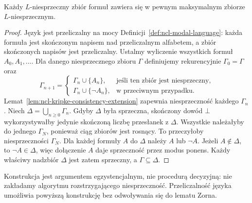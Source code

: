 \begin{lemat}
\label{lem:ncl-kripke-lindenbaum-extension}
Każdy $L$-niesprzeczny zbiór formuł zawiera
się w pewnym maksymalnym zbiorze
$L$-niesprzecznym.
\end{lemat}
\begin{proof}
Język jest przeliczalny na mocy
Definicji~\ref{def:ncl-modal-language}:
każda formuła jest skończonym napisem
nad przeliczalnym alfabetem, a zbiór
skończonych napisów jest przeliczalny.
Ustalmy wyliczenie wszystkich formuł
$A_0,A_1,\ldots$. Dla danego niesprzecznego
zbioru $\Gamma$ definiujemy rekurencyjnie
$\Gamma_0=\Gamma$ oraz
\[
 \Gamma_{n+1}=
 \begin{cases}
  \Gamma_n\cup\{A_n\},&
    \text{jeśli ten zbiór jest niesprzeczny},\\
  \Gamma_n\cup\{\neg A_n\},&
    \text{w przeciwnym przypadku}.
 \end{cases}
\]
Lemat~\ref{lem:ncl-kripke-consistency-extension}
zapewnia niesprzeczność każdego $\Gamma_n$.
Niech $\Delta=\bigcup_{n\geq 0}\Gamma_n$.
Gdyby $\Delta$ była sprzeczna, skończony
dowód $\bot$ wykorzystywałby jedynie skończoną
liczbę przesłanek z $\Delta$.
Wszystkie należałyby do jednego $\Gamma_N$,
ponieważ ciąg zbiorów jest rosnący.
To przeczyłoby niesprzeczności $\Gamma_N$.
Dla każdej formuły $A$ do $\Delta$ należy
$A$ lub $\neg A$. Jeżeli $A\notin\Delta$,
to $\neg A\in\Delta$, więc dołączenie $A$
daje sprzeczność przez modus ponens.
Każdy właściwy nadzbiór $\Delta$ jest zatem
sprzeczny, a $\Gamma\subseteq\Delta$.
\end{proof}

Konstrukcja jest argumentem egzystencjalnym,
nie procedurą decyzyjną: nie zakładamy
algorytmu rozstrzygającego niesprzeczność.
Przeliczalność języka umożliwia powyższą
konstrukcję bez odwoływania się do lematu Zorna.

